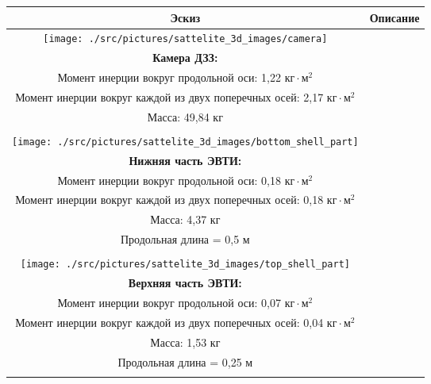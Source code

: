 \begin{table}[h!]
    \begin{tabular}{|c|c|}
        \hline
            Эскиз & Описание \\
        \hline
            \texttt{[image: ./src/pictures/sattelite\_3d\_images/camera]} &
            \shortstack[l] {
                \rule{0pt}{2mm} \\
                \textbf{Камера ДЗЗ:} \\
                Момент инерции вокруг продольной оси: 1,22 $\text{кг} \cdot \text{м}^{2}$ \\
                Момент инерции вокруг каждой из двух поперечных  осей: 2,17 $\text{кг} \cdot \text{м}^{2}$ \\
                Масса: 49,84 кг \\
                \rule{0pt}{2mm}
            } \\
        \hline
            \texttt{[image: ./src/pictures/sattelite\_3d\_images/bottom\_shell\_part]} &
            \shortstack[l] {
                \rule{0pt}{2mm} \\
                \textbf{Нижняя часть ЭВТИ:} \\
                Момент инерции вокруг продольной оси: 0,18 $\text{кг} \cdot \text{м}^{2}$ \\
                Момент инерции вокруг каждой из двух поперечных  осей: 0,18 $\text{кг} \cdot \text{м}^{2}$ \\
                Масса: 4,37 кг \\
                Продольная длина = 0,5 м \\
                \rule{0pt}{2mm}
            } \\
        \hline
            \texttt{[image: ./src/pictures/sattelite\_3d\_images/top\_shell\_part]} &
            \shortstack[l] {
                \rule{0pt}{2mm} \\
                \textbf{Верхняя часть ЭВТИ:} \\
                Момент инерции вокруг продольной оси: 0,07 $\text{кг} \cdot \text{м}^{2}$ \\
                Момент инерции вокруг каждой из двух поперечных  осей: 0,04 $\text{кг} \cdot \text{м}^{2}$ \\
                Масса: 1,53 кг \\
                Продольная длина = 0,25 м \\
                \rule{0pt}{2mm}
}
\end{tabular}
\end{table}
